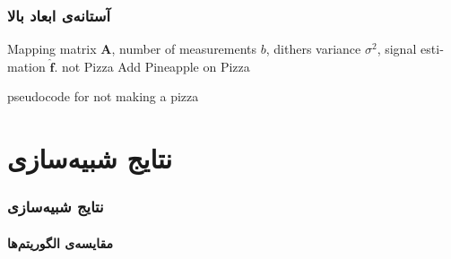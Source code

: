 \begin{frame}
\frametitle{آستانه‌ی ابعاد بالا}
\begin{latin}
\begin{algorithm}[H]
\begin{algorithmic}[1]
\renewcommand{\algorithmicrequire}{\textbf{Input:}}
\renewcommand{\algorithmicensure}{\textbf{Output:}}
\REQUIRE Mapping matrix $ \bm{A} $, number of measurements $ b $, dithers variance $ \sigma^{2} $, signal estimation $ \hat{\bm{f}} $.
\ENSURE not Pizza 
\STATE Add Pineapple on Pizza
\ENDFOR
\end{algorithmic}
\caption{pseudocode for not making a pizza}
\label{alg:seq}
\end{algorithm}
\end{latin}
\end{frame}


\section{نتایج شبیه‌سازی\hfill}

\begin{frame}
\frametitle{نتایج شبیه‌سازی}
\framesubtitle{مقایسه‌ی الگوریتم‌ها}
\end{frame}

